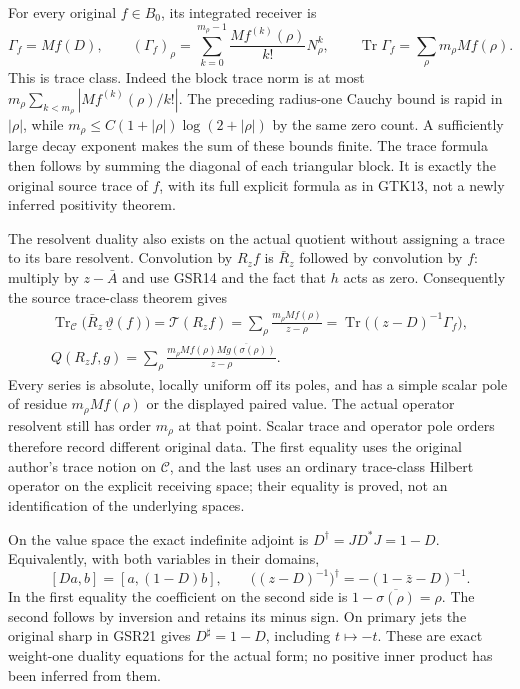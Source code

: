 For every original $f\in B_0$,
its integrated receiver is
\begin{equation}\tag{GSR22}
 \Gamma_f= Mf(D),\qquad
 (\Gamma_f)_\rho=
 \sum_{k=0}^{m_\rho-1}\frac{Mf^{(k)}(\rho)}{k!}N_\rho^k,
 \qquad
 \operatorname{Tr}\Gamma_f=\sum_\rho m_\rho Mf(\rho).
\end{equation}
This is trace class. Indeed the
block trace norm is at most
$m_\rho\sum_{k<m_\rho}|Mf^{(k)}(\rho)/k!|$.
The preceding radius-one Cauchy
bound is rapid in $|\rho|$,
while $m_\rho\le C(1+|\rho|)
\log(2+|\rho|)$ by the same
zero count. A sufficiently
large decay exponent makes
the sum of these bounds finite.
The trace formula then follows
by summing the diagonal of
each triangular block.
It is exactly the original
source trace of $f$, with its
full explicit formula as in
GTK13, not a newly inferred
positivity theorem.

The resolvent duality also
exists on the actual quotient
without assigning a trace to
its bare resolvent. Convolution
by $R_zf$ is
$\bar R_z$ followed by convolution
by $f$: multiply by
$z-\bar A$ and use GSR14 and
the fact that $h$ acts as zero.
Consequently the source
trace-class theorem gives
\begin{equation}\tag{GSR23}
 \begin{gathered}
 \operatorname{Tr}_{\mathcal C}
       \bigl(\bar R_z\,\underline\vartheta(f)\bigr)
  =\mathcal T(R_zf)
  =\sum_\rho\frac{m_\rho Mf(\rho)}{z-\rho}
  =\operatorname{Tr}\bigl((z-D)^{-1}\Gamma_f\bigr),\\
 Q(R_zf,g)=
   \sum_\rho\frac{m_\rho Mf(\rho)
                 \overline{Mg(\sigma(\rho))}}{z-\rho}.
 \end{gathered}
\end{equation}
Every series is absolute, locally
uniform off its poles, and
has a simple scalar pole of
residue $m_\rho Mf(\rho)$
or the displayed paired value.
The actual operator resolvent
still has order $m_\rho$ at
that point. Scalar trace and
operator pole orders therefore
record different original data.
The first equality uses the
original author's trace notion
on $\mathcal C$, and the last
uses an ordinary trace-class
Hilbert operator on the
explicit receiving space;
their equality is proved,
not an identification of the
underlying spaces.

On the value space the exact
indefinite adjoint is
$D^\dagger=JD^*J=1-D$.
Equivalently, with both variables
in their domains,
\begin{equation}\tag{GSR24}
 [Da,b]=[a,(1-D)b],\qquad
 \bigl((z-D)^{-1}\bigr)^\dagger=-(1-\bar z-D)^{-1}.
\end{equation}
In the first equality the
coefficient on the second
side is
$1-\overline{\sigma(\rho)}=\rho$.
The second follows by inversion
and retains its minus sign.
On primary jets the original
sharp in GSR21 gives
$D^\sharp=1-D$, including
$t\mapsto-t$. These are exact
weight-one duality equations
for the actual form; no
positive inner product has
been inferred from them.

